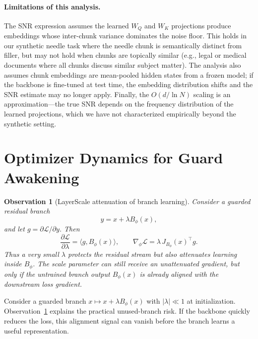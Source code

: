 \documentclass[preprint,12pt]{elsarticle}
\newtheorem{observation}[theorem]{Observation}
\begin{document}
\paragraph{Limitations of this analysis.} The SNR expression assumes the learned $W_Q$ and $W_K$ projections produce embeddings whose inter-chunk variance dominates the noise floor. This holds in our synthetic needle task where the needle chunk is semantically distinct from filler, but may not hold when chunks are topically similar (e.g., legal or medical documents where all chunks discuss similar subject matter). The analysis also assumes chunk embeddings are mean-pooled hidden states from a frozen model; if the backbone is fine-tuned at test time, the embedding distribution shifts and the SNR estimate may no longer apply. Finally, the $O(d / \ln N)$ scaling is an approximation---the true SNR depends on the frequency distribution of the learned projections, which we have not characterized empirically beyond the synthetic setting.

\section{Optimizer Dynamics for Guard Awakening}
\label{app:optimizer}

\begin{observation}[LayerScale attenuation of branch learning]
\label{prop:layerscale-grad}
Consider a guarded residual branch
\begin{equation}
y=x+\lambda B_\phi(x),
\end{equation}
and let $g=\partial\mathcal{L}/\partial y$. Then
\begin{equation}
\frac{\partial\mathcal{L}}{\partial\lambda}=\langle g,B_\phi(x)\rangle,
\qquad
\nabla_\phi\mathcal{L}=\lambda\,J_{B_\phi}(x)^\top g.
\end{equation}
Thus a very small $\lambda$ protects the residual stream but also attenuates learning inside $B_\phi$. The scale parameter can still receive an unattenuated gradient, but only if the untrained branch output $B_\phi(x)$ is already aligned with the downstream loss gradient.
\end{observation}



Consider a guarded branch $x\mapsto x+\lambda B_\phi(x)$ with $|\lambda|\ll1$ at initialization. Observation~\ref{prop:layerscale-grad} explains the practical unused-branch risk. If the backbone quickly reduces the loss, this alignment signal can vanish before the branch learns a useful representation.
\end{document}
